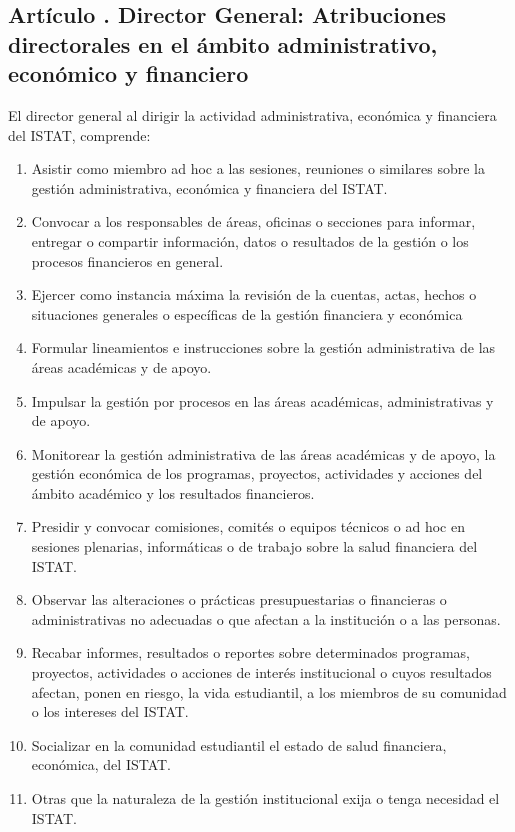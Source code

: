 \subsection{Artículo . Director General: Atribuciones directorales en el ámbito administrativo, económico y financiero}
\addtocounter{ns}{1}
El director general al dirigir la actividad administrativa, económica y financiera del ISTAT, comprende: 
\begin{enumerate}
\item Asistir como miembro ad hoc a las sesiones, reuniones o similares sobre la gestión administrativa, económica y financiera del ISTAT. 
\item Convocar a los responsables de áreas, oficinas o secciones para informar, entregar o compartir información, datos o resultados de la gestión o los procesos financieros en general. 
\item Ejercer como instancia máxima la revisión de la cuentas, actas, hechos o situaciones generales o específicas de la gestión financiera y económica 
\item Formular lineamientos e instrucciones sobre la gestión administrativa de las áreas académicas y de apoyo. 
\item Impulsar la gestión por procesos en las áreas académicas, administrativas y de apoyo. 
\item Monitorear la gestión administrativa de las áreas académicas y de apoyo, la gestión económica de los programas, proyectos, actividades y acciones del ámbito académico y los resultados financieros. 
\item Presidir y convocar comisiones, comités o equipos técnicos o ad hoc en sesiones plenarias, informáticas o de trabajo sobre la salud financiera del ISTAT. 
\item Observar las alteraciones o prácticas presupuestarias o financieras o administrativas no adecuadas o que afectan a la institución o a las personas. 
\item Recabar informes, resultados o reportes sobre determinados programas, proyectos, actividades o acciones de interés institucional o cuyos resultados afectan, ponen en riesgo, la vida estudiantil, a los miembros de su comunidad o los intereses del ISTAT. 
\item Socializar en la comunidad estudiantil el estado de salud financiera, económica, del ISTAT. 
\item Otras que la naturaleza de la gestión institucional exija o tenga necesidad el ISTAT. 
\end{enumerate}
